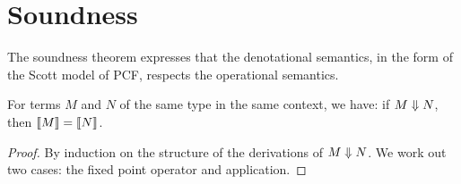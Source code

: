 \section{Soundness}\label{sec:soundness}

The soundness theorem expresses that the denotational semantics, in the form of
the Scott model of PCF, respects the operational semantics.

\begin{theorem}[Soundness]\label{soundness}
  For terms \(M\) and \(N\) of the same type in the same context, we have: if
  \(M \Downarrow N\), then \(\llbracket M\rrbracket = \llbracket N\rrbracket\).
\end{theorem}
\begin{proof}
  By induction on the structure of the derivations of \(M \Downarrow N\).
  We work out two cases: the fixed point operator and application.


\end{proof}
